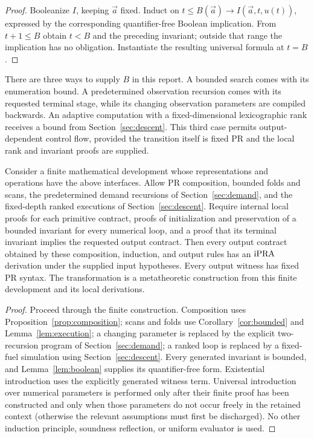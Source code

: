 \begin{proof}
Booleanize \(I\), keeping \(\vec a\) fixed. Induct on
\(t\le B(\vec a)\to I(\vec a,t,u(t))\), expressed by the corresponding
quantifier-free Boolean implication. From \(t+1\le B\) obtain \(t<B\)
and the preceding invariant; outside that range the implication has no
obligation. Instantiate the resulting universal formula at \(t=B\).
\end{proof}

There are three ways to supply \(B\) in this report. A bounded search
comes with its enumeration bound. A predetermined observation recursion
comes with its requested terminal stage, while its changing observation
parameters are compiled backwards. An adaptive computation with a
fixed-dimensional lexicographic rank receives a bound from
Section~\ref{sec:descent}. This third case permits output-dependent
control flow, provided the transition itself is fixed PR and the local
rank and invariant proofs are supplied.

\begin{theorem}
\label{thm:compilation}
Consider a finite mathematical development whose representations and
operations have the above interfaces. Allow PR composition, bounded
folds and scans, the predetermined demand recursions of
Section~\ref{sec:demand}, and the fixed-depth ranked executions of
Section~\ref{sec:descent}. Require internal local proofs for each
primitive contract, proofs of initialization and preservation of a bounded
invariant for every numerical loop, and a proof that its terminal
invariant implies the requested output contract.
Then every output contract obtained by these composition, induction, and
output rules has an \(\mathrm{iPRA}\) derivation under the supplied input
hypotheses. Every output witness
has fixed PR syntax. The transformation is a metatheoretic construction
from this finite development and its local derivations.
\end{theorem}

\begin{proof}
Proceed through the finite construction. Composition uses
Proposition~\ref{prop:composition}; scans and folds use
Corollary~\ref{cor:bounded} and Lemma~\ref{lem:execution}; a changing
parameter is replaced by the explicit two-recursion program of
Section~\ref{sec:demand}; a ranked loop is replaced by a fixed-fuel
simulation using Section~\ref{sec:descent}. Every generated invariant
is bounded, and Lemma~\ref{lem:boolean} supplies its quantifier-free
form. Existential introduction uses the explicitly generated witness
term. Universal introduction over numerical parameters is performed
only after their finite proof has been constructed and only when those
parameters do not occur freely in the retained context (otherwise the
relevant assumptions must first be discharged). No other induction
principle, soundness reflection, or uniform evaluator is used.
\end{proof}

